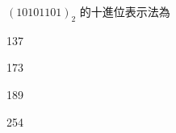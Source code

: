 \ifx\ntpcNinetyTwo\undefined[92學年基北區] \fi
${(10101101)}_2$ 的十進位表示法為
\begin{optionlist}
\item 137
\item 173\label{ntpc-92-a1}
\item 189
\item 254
\end{optionlist}